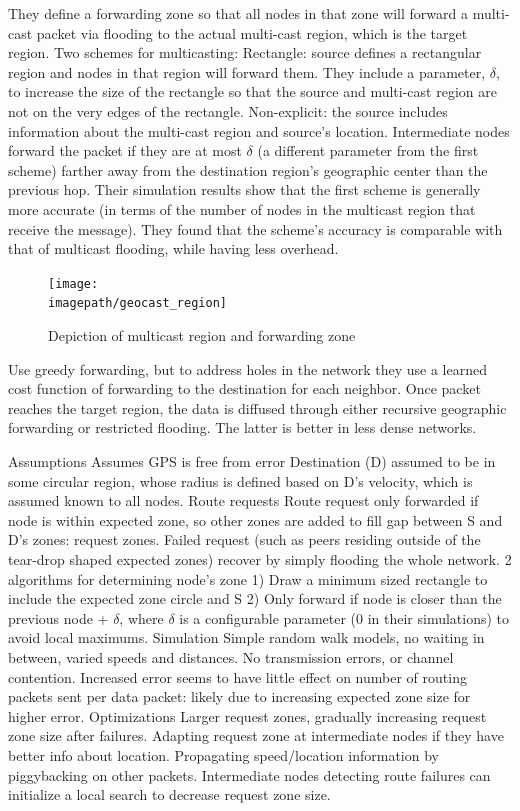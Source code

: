 \documentclass[conference]{IEEEtran}
\newcommand{\imagepath}{../../images/external/location_routing}
\begin{document}
\cite{749282} They define a forwarding zone so that all nodes in that zone will forward a multi-cast packet via flooding to the actual multi-cast region, which is the target region.
Two schemes for multicasting:          
Rectangle: source defines a rectangular region and nodes in that region will forward them. 
They include a parameter, $\delta$, to increase the size of the rectangle so that the source and multi-cast region are not on the very edges of the rectangle.          
Non-explicit: the source includes information about the multi-cast region and source's location.  Intermediate nodes forward the packet if they are at most $\delta$ (a different parameter from the first scheme) farther away from the destination region's geographic center than the previous hop.
Their simulation results show that the first scheme is generally more accurate (in terms of the number of nodes in the multicast region that receive the message).
They found that the scheme's accuracy is comparable with that of multicast flooding, while having less overhead.

\begin{figure}
\label{fig:multicast-region}
\centering
\texttt{[image: \\imagepath/geocast\_region]}
\caption{Depiction of multicast region and forwarding zone}
\end{figure}

\cite{Yu01geographicaland} Use greedy forwarding, but to address holes in the network they use a learned cost function of forwarding to the destination for each neighbor.  Once packet reaches the target region, the data is diffused through either recursive geographic forwarding or restricted flooding.  The latter is better in less dense networks.

\cite{Ko98location-aidedrouting} Assumptions        
Assumes GPS is free from error
Destination (D) assumed to be in some circular region, whose radius is defined based on D's velocity, which is assumed known to all nodes.
Route requests        
Route request  only forwarded if node is within expected zone, so other zones are added to fill gap between S and D's zones: request zones.
Failed request (such as peers residing outside of the tear-drop shaped expected zones) recover by simply flooding the whole network.
2 algorithms for determining node's zone
1) Draw a minimum sized rectangle to include the expected zone circle and S
2) Only forward if node is closer than the previous node + $\delta$, where $\delta$ is a configurable parameter (0 in their simulations) to avoid local maximums.
Simulation        
Simple random walk models, no waiting in between, varied speeds and distances.
No transmission errors, or channel contention.
Increased error seems to have little effect on number of routing packets sent per data packet: likely due to increasing expected zone size for higher error.
Optimizations        
Larger request zones, gradually increasing request zone size after failures.
Adapting request zone at intermediate nodes if they have better info about location.
Propagating speed/location information by piggybacking on other packets.
Intermediate nodes detecting route failures can initialize a local search to decrease request zone size.
\end{document}
